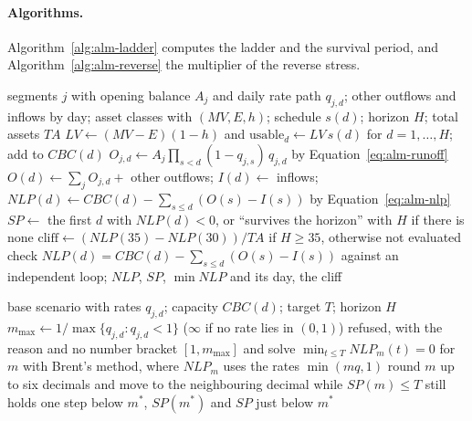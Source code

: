 

\paragraph{Algorithms.}
Algorithm~\ref{alg:alm-ladder} computes the ladder and the survival period, and Algorithm~\ref{alg:alm-reverse} the multiplier of the reverse stress.
\begin{algorithm}[htbp]
\caption{Net liquidity position, survival period and cliff effect of one balance sheet under one scenario.}
\label{alg:alm-ladder}
\begin{algorithmic}[1]
\Require segments $j$ with opening balance $A_j$ and daily rate path $q_{j,d}$; other outflows and inflows by day; asset classes with $(MV,E,h)$; schedule $s(d)$; horizon $H$; total assets $TA$
  \State $LV\gets(MV-E)(1-h)$ and $\text{usable}_d\gets LV\,s(d)$ for $d=1,\dots,H$; add to $CBC(d)$
\EndFor
{}
  \State $O_{j,d}\gets A_j\prod_{s<d}(1-q_{j,s})\,q_{j,d}$ by Equation~\ref{eq:alm-runoff}
\EndFor
\State $O(d)\gets\sum_jO_{j,d}+$ other outflows; $I(d)\gets$ inflows; $NLP(d)\gets CBC(d)-\sum_{s\le d}(O(s)-I(s))$ by Equation~\ref{eq:alm-nlp}
\State $SP\gets$ the first $d$ with $NLP(d)<0$, or ``survives the horizon'' with $H$ if there is none
\State $\text{cliff}\gets(NLP(35)-NLP(30))/TA$ if $H\ge35$, otherwise not evaluated
\State check $NLP(d)=CBC(d)-\sum_{s\le d}(O(s)-I(s))$ against an independent loop; \Return $NLP$, $SP$, $\min NLP$ and its day, the cliff
\end{algorithmic}
\end{algorithm}
\begin{algorithm}[htbp]
\caption{Reverse stress: the smallest run-off multiplier at which the survival period reaches the target.}
\label{alg:alm-reverse}
\begin{algorithmic}[1]
\Require base scenario with rates $q_{j,d}$; capacity $CBC(d)$; target $T$; horizon $H$
\State $m_{\max}\gets 1/\max\{q_{j,d}:q_{j,d}<1\}$ ($\infty$ if no rate lies in $(0,1)$)
  \State \Return refused, with the reason and no number
\EndIf
\State bracket $[1,m_{\max}]$ and solve $\min_{t\le T}NLP_m(t)=0$ for $m$ with Brent's method, where $NLP_m$ uses the rates $\min(mq,1)$
\State round $m$ up to six decimals and move to the neighbouring decimal while $SP(m)\le T$ still holds one step below
\State \Return $m^{*}$, $SP(m^{*})$ and $SP$ just below $m^{*}$
\end{algorithmic}
\end{algorithm}

